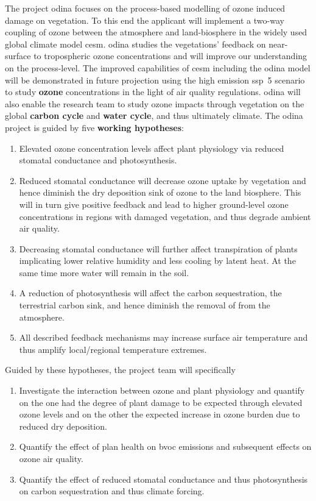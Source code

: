 The project \gls{odina} focuses on the process-based modelling of ozone induced damage on vegetation. To this end the applicant will implement a two-way coupling of ozone between the atmosphere and land-biosphere in the widely used global climate model \gls{cesm}. \gls{odina} studies the vegetations' feedback on near-surface to tropospheric ozone concentrations and will improve our understanding on the process-level. The improved capabilities of \gls{cesm} including the \gls{odina} model will be demonstrated in future projection using the high emission \gls{ssp}~5 scenario to study \textbf{\color{red}ozone} concentrations in the light of air quality regulations. \gls{odina} will also enable the research team to study ozone impacts through vegetation on the global \textbf{\color{darkgray}carbon cycle} and \textbf{\color{blue}water cycle}, and thus ultimately climate.
The \gls{odina} project is guided by five \textbf{working hypotheses}: 

\begin{enumerate}
\itemsep0pt
\item Elevated ozone concentration levels affect plant physiology via reduced stomatal conductance and photosynthesis. 
\item Reduced stomatal conductance will decrease ozone uptake by vegetation and hence diminish the dry deposition sink of ozone to the land biosphere. This will in turn give  positive feedback and lead to higher ground-level ozone concentrations in regions with damaged vegetation, and thus degrade ambient air quality.
\item Decreasing stomatal conductance will further affect transpiration of plants implicating lower relative humidity and less cooling by latent heat. At the same time more water will remain in the soil.
\item A reduction of photosynthesis will affect the carbon sequestration, the terrestrial carbon sink, and hence diminish the removal of  from the atmosphere.
\item All described feedback mechanisms may increase surface air temperature and thus amplify local/regional temperature extremes.
\end{enumerate}

Guided by these hypotheses, the project team will specifically
\begin{enumerate}
\itemsep0pt
\item Investigate the interaction between ozone and plant physiology and quantify on the one had the degree of plant damage to be expected through elevated ozone levels and on the other the expected increase in ozone burden due to reduced dry deposition.
\item Quantify the effect of plan health on \gls{bvoc} emissions and subsequent effects on ozone air quality.  
\item Quantify the effect of reduced stomatal conductance and thus photosynthesis on carbon sequestration and thus climate forcing.
\end{enumerate}

